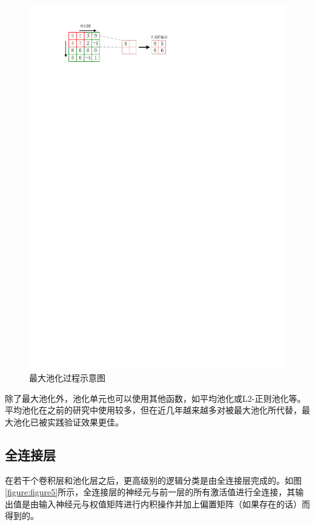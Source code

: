 \begin{figure}[htbp]
    \begin{center}
    \includegraphics{figures/pool.pdf}
    \end{center}
    \caption{最大池化过程示意图}\label{figure:figure4}
\end{figure}

除了最大池化外，池化单元也可以使用其他函数，如平均池化或L2-正则池化等。平均池化在之前的研究中使用较多，但在近几年越来越多对被最大池化所代替，最大池化已被实践验证效果更佳。

\subsection{全连接层}

在若干个卷积层和池化层之后，更高级别的逻辑分类是由全连接层完成的。如图\ref{figure:figure5}所示，全连接层的神经元与前一层的所有激活值进行全连接，其输出值是由输入神经元与权值矩阵进行内积操作并加上偏置矩阵（如果存在的话）而得到的。

